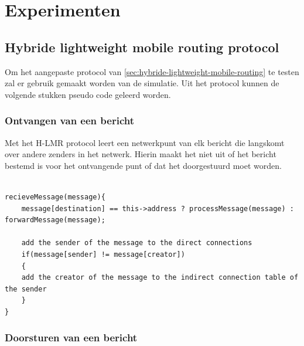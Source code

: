 \documentclass[a4paper, 11pt, oneside]{report}
\begin{document}
\chapter{Experimenten}
\label{experimenten}


\section{Hybride lightweight mobile routing protocol}

Om het aangepaste protocol van \autoref{sec:hybride-lightweight-mobile-routing} te testen zal er gebruik gemaakt worden van de simulatie.
Uit het protocol kunnen de volgende stukken pseudo code geleerd worden.

\subsection{Ontvangen van een bericht}

Met het H-LMR protocol leert een netwerkpunt van elk bericht die langskomt over andere zenders in het netwerk.
Hierin maakt het niet uit of het bericht bestemd is voor het ontvangende punt of dat het doorgestuurd moet worden. 

\begin{lstlisting}

recieveMessage(message){
	message[destination] == this->address ? processMessage(message) : forwardMessage(message);
	
	add the sender of the message to the direct connections
	if(message[sender] != message[creator])
	{
	add the creator of the message to the indirect connection table of the sender
	}
}

\end{lstlisting}

\subsection{Doorsturen van een bericht}
\end{document}
